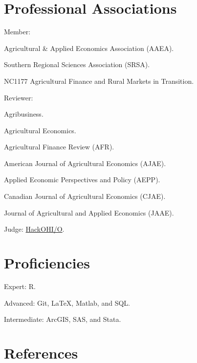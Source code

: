 \documentclass[letterpaper]{article}
\renewenvironment{itemize}{
  \begin{list}{}{
    \setlength{\leftmargin}{1.5em}
  }
}{
  \end{list}
}
\begin{document}
\newpage

\section*{Professional Associations}

\begin{itemize}
\item Member:
  \begin{itemize}
  \item Agricultural \& Applied Economics Association (AAEA).
  \item Southern Regional Sciences Association (SRSA).
  \item NC1177 Agricultural Finance and Rural Markets in Transition.
  \end{itemize}
\item Reviewer:
  \begin{itemize}
  \item Agribusiness.
  \item Agricultural Economics.
  \item Agricultural Finance Review (AFR).
  \item American Journal of Agricultural Economics (AJAE).
  \item Applied Economic Perspectives and Policy (AEPP).
  \item Canadian Journal of Agricultural Economics (CJAE).
  \item Journal of Agricultural and Applied Economics (JAAE).
  \end{itemize}
\item Judge: \href{http://hack.osu.edu/2016/}{HackOHI/O}.
\end{itemize}


\section*{Proficiencies}

\begin{itemize}
\item Expert: R.
\item Advanced: Git, \LaTeX, Matlab, and SQL.
\item Intermediate: ArcGIS, SAS, and Stata.
\end{itemize}


\section*{References}
\end{document}
